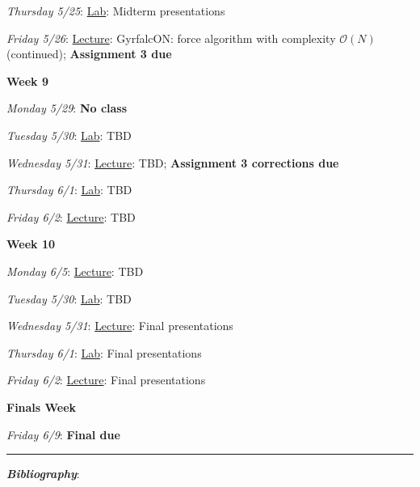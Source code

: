 \documentclass[12pt]{article}
\begin{document}
\emph{Thursday 5/25}: \underline{Lab}: Midterm presentations

\emph{Friday 5/26}: \underline{Lecture}: GyrfalcON: force algorithm with complexity $\mathcal{O}(N)$ (continued); \textbf{Assignment 3 due}

\noindent\textbf{Week 9}

\emph{Monday 5/29}: \textbf{No class}

\emph{Tuesday 5/30}: \underline{Lab}: TBD

\emph{Wednesday 5/31}: \underline{Lecture}: TBD;  \textbf{Assignment 3 corrections due}

\emph{Thursday 6/1}: \underline{Lab}: TBD

\emph{Friday 6/2}: \underline{Lecture}: TBD

\noindent\textbf{Week 10}

\emph{Monday 6/5}: \underline{Lecture}: TBD

\emph{Tuesday 5/30}: \underline{Lab}: TBD

\emph{Wednesday 5/31}: \underline{Lecture}: Final presentations

\emph{Thursday 6/1}: \underline{Lab}: Final presentations

\emph{Friday 6/2}: \underline{Lecture}: Final presentations

\noindent\textbf{Finals Week}

\emph{Friday 6/9}: \textbf{Final due}

\begin{center}
  \rule{\textwidth}{0.5pt}
\end{center}
\nocite{*}

\noindent\textbf{\emph{Bibliography}}:\\
\end{document}
